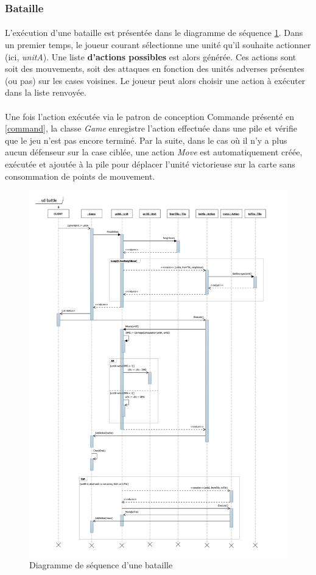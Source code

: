 \subsubsection{Bataille}

\paragraph{}
L'exécution d'une bataille est présentée dans le diagramme de séquence \ref{fig:sd_battle}.
Dans un premier temps, le joueur courant sélectionne une unité qu'il souhaite actionner (ici, \emph{unitA}).
Une liste \textbf{d'actions possibles} est alors générée. Ces actions sont soit des mouvements, soit des attaques en fonction des unités adverses présentes (ou pas) sur les cases voisines.
Le joueur peut alors choisir une action à exécuter dans la liste renvoyée.

\paragraph{}
Une fois l'action exécutée via le patron de conception Commande présenté en \ref{command}, la classe \emph{Game} enregistre l'action effectuée dans une pile et vérifie que le jeu n'est pas encore terminé.
Par la suite, dans le cas où il n'y a plus aucun défenseur sur la case ciblée, une action \emph{Move} est automatiquement créée, exécutée et ajoutée à la pile pour déplacer l'unité victorieuse sur la carte sans consommation de points de mouvement.

\begin{figure}
  \centering
  \includegraphics[width=13cm]{schemas/sd_battle.png}
  \caption{Diagramme de séquence d'une bataille}
  \label{fig:sd_battle}
\end{figure}
